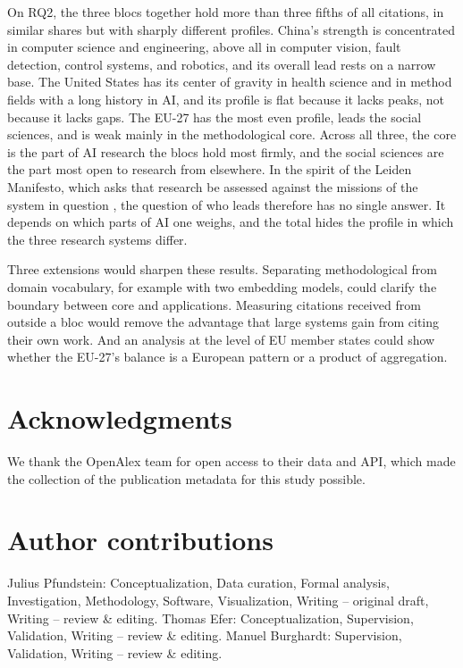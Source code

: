 \documentclass[10pt,twocolumn,a4paper]{article}
\begin{document}
	On RQ2, the three blocs together hold more than three fifths of all citations, in similar shares but with sharply different profiles. China's strength is concentrated in computer science and engineering, above all in computer vision, fault detection, control systems, and robotics, and its overall lead rests on a narrow base. The United States has its center of gravity in health science and in method fields with a long history in AI, and its profile is flat because it lacks peaks, not because it lacks gaps. The EU-27 has the most even profile, leads the social sciences, and is weak mainly in the methodological core. Across all three, the core is the part of AI research the blocs hold most firmly, and the social sciences are the part most open to research from elsewhere. In the spirit of the Leiden Manifesto, which asks that research be assessed against the missions of the system in question \parencite{hicks2015bibliometrics}, the question of who leads therefore has no single answer. It depends on which parts of AI one weighs, and the total hides the profile in which the three research systems differ.
	
	Three extensions would sharpen these results. Separating methodological from domain vocabulary, for example with two embedding models, could clarify the boundary between core and applications. Measuring citations received from outside a bloc would remove the advantage that large systems gain from citing their own work. And an analysis at the level of EU member states could show whether the EU-27's balance is a European pattern or a product of aggregation.
	
	\section*{Acknowledgments}
	We thank the OpenAlex team for open access to their data and API, which made the collection of the publication metadata for this study possible.
	
	\section*{Author contributions}
	Julius Pfundstein: Conceptualization, Data curation, Formal analysis, Investigation, Methodology, Software, Visualization, Writing -- original draft, Writing -- review \& editing. Thomas Efer: Conceptualization, Supervision, Validation, Writing -- review \& editing. Manuel Burghardt: Supervision, Validation, Writing -- review \& editing.
	
\end{document}
